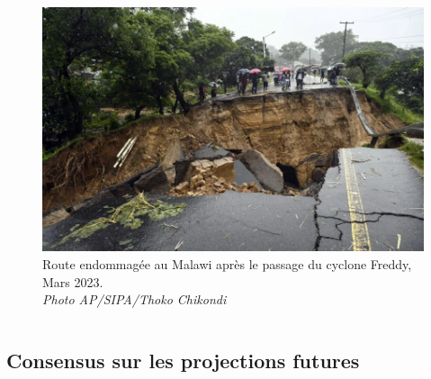 \documentclass[aspectratio=169, usepdftitle=false, xcolor={dvipsnames}, 9pt]{beamer}
\begin{document}
\begin{frame}[c]
\begin{columns}
\begin{column}{0.45\textwidth}
\begin{figure}[h]
                 \includegraphics[width=\textwidth]{Figures/freddy_malawi_route.png}
                 \caption{Route endommagée au Malawi après le passage du cyclone Freddy, Mars 2023.\\\textit{Photo AP/SIPA/Thoko Chikondi}}
             \end{figure}
        \end{column}
    \end{columns}
\end{frame}

\subsection{Consensus sur les projections futures}
\end{document}
